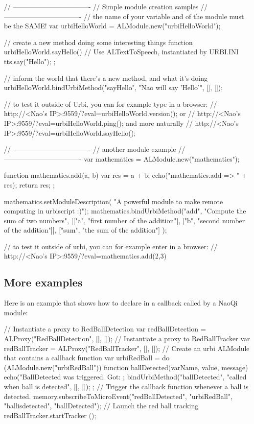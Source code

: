 \begin{urbiunchecked}
// ----------------------------------
// Simple module creation samples
// ----------------------------------
// the name of your variable and of the module must be the SAME!
var urbiHelloWorld = ALModule.new("urbiHelloWorld");

// create a new method doing some interesting things
function urbiHelloWorld.sayHello()
{
  // Use ALTextToSpeech, instantiated by URBI.INI
  tts.say("Hello");
};

// inform the world that there's a new method, and what it's doing
urbiHelloWorld.bindUrbiMethod("sayHello", "Nao will say 'Hello'", [], []);

// to test it outside of Urbi, you can for example type in a browser:
// http://<Nao's IP>:9559/?eval=urbiHelloWorld.version(); or
// http://<Nao's IP>:9559/?eval=urbiHelloWorld.ping(); and more naturally
// http://<Nao's IP>:9559/?eval=urbiHelloWorld.sayHello();

// ----------------------------------
// another module example
// ----------------------------------
var mathematics = ALModule.new("mathematics");

function mathematics.add(a, b)
{
  var res = a + b;
  echo("mathematics.add => " + res);
  return res;
};

mathematics.setModuleDescription(
  "A powerful module to make remote computing in urbiscript :)");
mathematics.bindUrbiMethod("add", "Compute the sum of two numbers",
[["a",   "first number of the addition"],
 ["b",   "second number of the addition"]],
 ["sum", "the sum of the addition"] );

// to test it outside of urbi, you can for example enter in a browser:
// http://<Nao's IP>:9559/?eval=mathematics.add(2,3)
\end{urbiunchecked}


\subsection{More examples}

Here is an example that shows how to declare in \us a callback called by a
NaoQi module:

\begin{urbiunchecked}
// Instantiate a proxy to RedBallDetection
var redBallDetection = ALProxy("RedBallDetection", [], []);
// Instantiate a proxy to RedBallTracker
var redBallTracker = ALProxy("RedBallTracker", [], []);
// Create an urbi ALModule that contains a callback function
var urbiRedBall = do (ALModule.new("urbiRedBall"))
{
  function ballDetected(varName, value, message) {
    echo("BallDetected was triggered. Got: %
  };
  bindUrbiMethod("ballDetected", "called when ball is detected", [], []);
};
// Trigger the callback function whenever a ball is detected.
memory.subscribeToMicroEvent("redBallDetected", "urbiRedBall",
                             "ballisdetected", "ballDetected");
// Launch the red ball tracking
redBallTracker.startTracker ();
\end{urbiunchecked}

